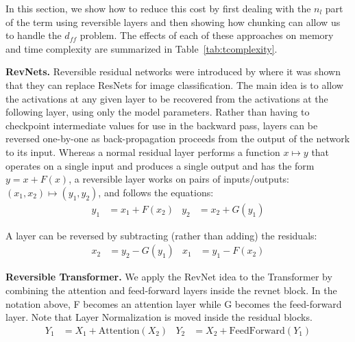 \documentclass{article} %
\renewcommand{\paragraph}[1]{\textbf{#1}}
\begin{document}
In this section, we show how to reduce this cost by first dealing with the
$n_l$ part of the term using reversible layers and then showing how chunking
can allow us to handle the $d_{ff}$ problem.
The effects of each of these approaches on memory and time complexity are summarized in Table~\ref{tab:tcomplexity}.


\paragraph{RevNets.}
Reversible residual networks were introduced by \citet{gomez2017reversible} where it was shown
that they can replace ResNets for image classification.
The main idea is to allow the activations at any given layer to be recovered from the activations at the following layer, using only the model parameters. Rather than having to checkpoint intermediate values for use in the backward pass, layers can be reversed one-by-one as back-propagation proceeds from the output of the network to its input. Whereas a normal residual layer performs a function $x \mapsto y$ that operates on a single input and produces a single output and has the form $y = x + F(x)$, a reversible layer works on pairs of inputs/outputs: $(x_1, x_2) \mapsto (y_1, y_2)$, and follows the equations:
%
\begin{align}
    y_1 &= x_1 + F(x_2) &
    y_2 &= x_2 + G(y_1)
\end{align}

A layer can be reversed by subtracting (rather than adding) the residuals:
%
\begin{align}\label{eq:reverse-ff}
    x_2 &= y_2 - G(y_1) &
    x_1 &= y_1 - F(x_2)
\end{align}


\paragraph{Reversible Transformer.}
We apply the RevNet idea to the Transformer by combining the attention and
feed-forward layers inside the revnet block. In the notation above,
F becomes an attention layer while G becomes the feed-forward layer. Note that Layer Normalization \citep{layernorm2016} is moved inside the residual blocks.
%
\begin{align}
    Y_1 &= X_1 + \mathrm{Attention}(X_2) &
    Y_2 &= X_2 + \mathrm{FeedForward}(Y_1)
\end{align}
\end{document}

